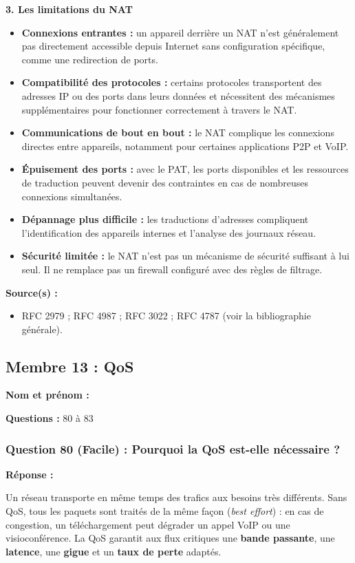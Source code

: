 \documentclass[12pt,a4paper]{article}
\newcommand{\membre}[2]{%
  \textbf{Nom et prénom :} #1 \par
  \textbf{Questions :} #2 \par
}
\newcommand{\reponse}{\textbf{Réponse :}\par}
\newcommand{\sources}{\textbf{Source(s) :}}
\begin{document}
\textbf{3. Les limitations du NAT}
\begin{itemize}
    \item \textbf{Connexions entrantes :} un appareil derrière un NAT
    n'est généralement pas directement accessible depuis Internet sans
    configuration spécifique, comme une redirection de ports.
    \item \textbf{Compatibilité des protocoles :} certains protocoles
    transportent des adresses IP ou des ports dans leurs données et
    nécessitent des mécanismes supplémentaires pour fonctionner
    correctement à travers le NAT.
    \item \textbf{Communications de bout en bout :} le NAT complique
    les connexions directes entre appareils, notamment pour certaines
    applications P2P et VoIP.
    \item \textbf{Épuisement des ports :} avec le PAT, les ports
    disponibles et les ressources de traduction peuvent devenir des
    contraintes en cas de nombreuses connexions simultanées.
    \item \textbf{Dépannage plus difficile :} les traductions
    d'adresses compliquent l'identification des appareils internes et
    l'analyse des journaux réseau.
    \item \textbf{Sécurité limitée :} le NAT n'est pas un mécanisme de
    sécurité suffisant à lui seul. Il ne remplace pas un firewall
    configuré avec des règles de filtrage.
\end{itemize}

\sources
\begin{itemize}
    \item RFC 2979 ; RFC 4987 ; RFC 3022 ; RFC 4787 (voir la
    bibliographie générale).
\end{itemize}

\subsection{Membre 13 : QoS}
\membre{\dotfill}{80 à 83}

\subsubsection*{Question 80 (Facile) : Pourquoi la QoS est-elle nécessaire ?}

\reponse
Un réseau transporte en même temps des trafics aux besoins très
différents. Sans QoS, tous les paquets sont traités de la même façon
(\textit{best effort}) : en cas de congestion, un téléchargement peut
dégrader un appel VoIP ou une visioconférence. La QoS garantit aux
flux critiques une \textbf{bande passante}, une \textbf{latence}, une
\textbf{gigue} et un \textbf{taux de perte} adaptés.
\end{document}
